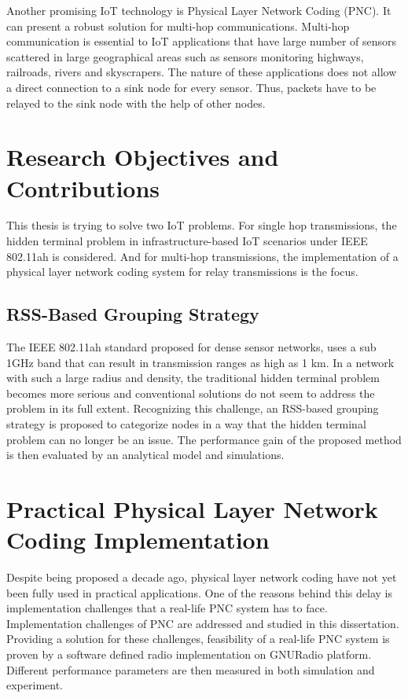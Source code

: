 Another promising IoT technology is Physical Layer Network Coding (PNC). It can present a robust solution for multi-hop communications. Multi-hop communication is essential to IoT applications that have large number of sensors scattered in large geographical areas such as sensors monitoring highways, railroads, rivers and skyscrapers. The nature of these applications does not allow a direct connection to a sink node for every sensor. Thus, packets have to be relayed to the sink node with the help of other nodes. 


\section{Research Objectives and Contributions}
This thesis is trying to solve two IoT problems. For single hop transmissions, the hidden terminal problem in infrastructure-based IoT scenarios under IEEE 802.11ah is considered. And for multi-hop transmissions, the implementation of a physical layer network coding system for relay transmissions is the focus.

\subsection{RSS-Based Grouping Strategy}
The IEEE 802.11ah standard proposed for dense sensor networks, uses a sub 1GHz band that can result in transmission ranges as high as 1 km. In a network with such a large radius and density, the traditional hidden terminal problem becomes more serious and conventional solutions do not seem to address the problem in its full extent. Recognizing this challenge, an RSS-based grouping strategy is proposed to categorize nodes in a way that the hidden terminal problem can no longer be an issue. The performance gain of the proposed method is then evaluated by an analytical model and simulations.


\section{Practical Physical Layer Network Coding Implementation}
Despite being proposed a decade ago, physical layer network coding have not yet been fully used in practical applications. One of the reasons behind this delay is implementation challenges that a real-life PNC system has to face. Implementation challenges of PNC are addressed and studied in this dissertation. Providing a solution for these challenges, feasibility of a real-life PNC system is proven by a software defined radio implementation on GNURadio platform. Different performance parameters are then measured in both simulation and experiment. 


